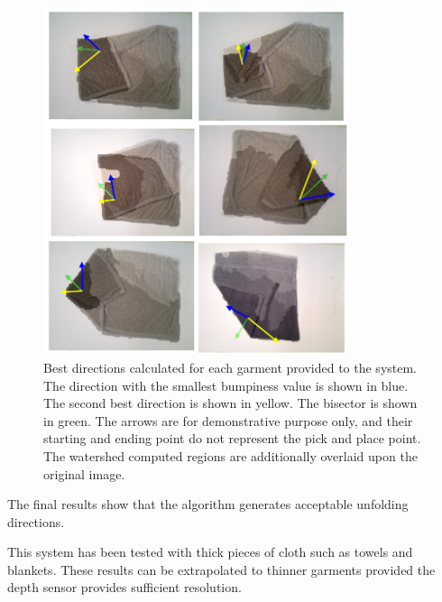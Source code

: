 \begin{figure}[thpb]
    \centering
    \includegraphics[width=0.8\textwidth]{figures/directions_several.png}
    \caption{Best directions calculated for each garment provided to the system. The direction with the smallest bumpiness value is shown in blue. The second best direction is shown in yellow. The bisector is shown in green. The arrows are for demonstrative purpose only, and their starting and ending point do not represent the pick and place point. The watershed computed regions are additionally overlaid upon the original image.}
    \label{directions_several}
\end{figure}

The final results show that the algorithm generates acceptable unfolding directions.

This system has been tested with thick pieces of cloth such as towels and blankets. These results can be extrapolated to thinner garments provided the depth sensor provides sufficient resolution.
